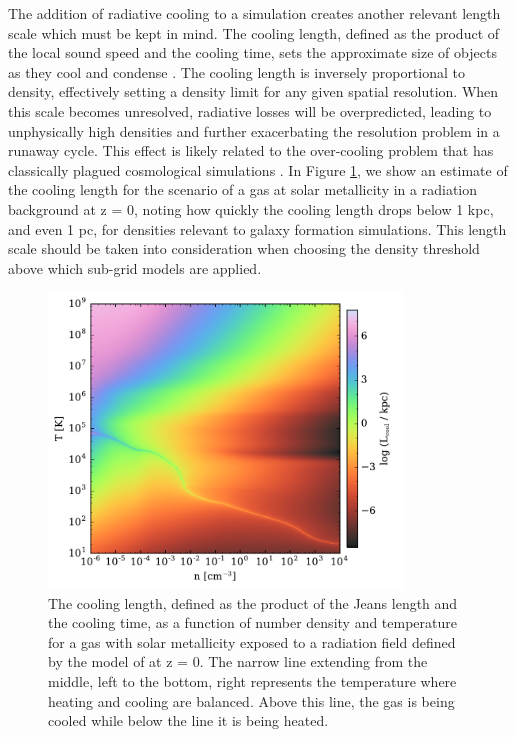 The addition of radiative cooling to a simulation creates another
relevant length scale which must be kept in mind.  The cooling length,
defined as the product of the local sound speed and the cooling time,
sets the approximate size of objects as they cool and condense
\citep{2009A&A...508..725I}.  The cooling length is inversely
proportional to density, effectively setting a density limit for
any given spatial resolution.  When this scale becomes unresolved,
radiative losses will be overpredicted, leading to unphysically high
densities and further exacerbating the resolution problem in a runaway
cycle.  This effect is likely related to the over-cooling problem that
has classically plagued cosmological simulations
\citep[e.g.][]{1996ApJS..105...19K, 2001MNRAS.326.1228B}.
In Figure \ref{fig:cooling-length}, we show an estimate of the
cooling length for the scenario of a gas at solar metallicity in a
\citet{2012ApJ...746..125H} radiation background at z = 0, noting how
quickly the cooling length drops below 1 kpc, and even 1 pc, for
densities relevant to galaxy formation simulations.  This
length scale should be taken into consideration when choosing the
density threshold above which sub-grid models are applied.

\begin{figure}
  \centering
  \includegraphics[width=0.84\textwidth]{cooling_length.pdf}
  \caption{
    The cooling length, defined as the product of the Jeans length and
    the cooling time, as a function of number density and temperature
    for a gas with solar metallicity exposed to a radiation field
    defined by the model of \citet{2012ApJ...746..125H} at z = 0.  The
    narrow line extending from the middle, left to the bottom, right
    represents the temperature where heating and cooling are
    balanced.  Above this line, the gas is being cooled while below
    the line it is being heated.
  } \label{fig:cooling-length}
\end{figure}

